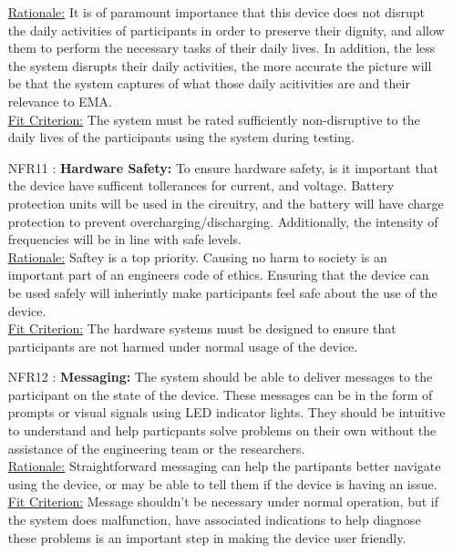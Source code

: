 \documentclass[12pt]{article}
\begin{document}
\begin{itemize}
\underline{Rationale:} It is of paramount importance that this device does not disrupt the daily activities of participants in order to preserve their dignity, and allow them to perform the necessary tasks of their daily lives. In addition, the less the system disrupts their daily activities, the more accurate the picture will be that the system captures of what those daily acitivities are and their relevance to EMA.\\

\underline{Fit Criterion:} The system must be rated sufficiently non-disruptive to the daily lives of the participants using the system during testing.\\

\item[NFR11 \label{NFR11}:]
  \textbf{Hardware Safety:} To ensure hardware safety, is it important that the device have sufficent tollerances for current, and voltage. Battery protection units will be used in the circuitry, and the battery will have charge protection to prevent overcharging/discharging. Additionally, the intensity of frequencies will be in line with safe levels.\\

\underline{Rationale:} Saftey is a top priority. Causing no harm to society is an important part of an engineers code of ethics. Ensuring that the device can be used safely will inherintly make participants feel safe about the use of the device.\\

\underline{Fit Criterion:} The hardware systems must be designed to ensure that participants are not harmed under normal usage of the device.\\

\item[NFR12 \label{NFR12}:]
  \textbf{Messaging:} The system should be able to deliver messages to the participant on the state of the device. These messages can be in the form of prompts or visual signals using LED indicator lights. They should be intuitive to understand and help particpants solve problems on their own without the assistance of the engineering team or the researchers.\\

\underline{Rationale:} Straightforward messaging can help the partipants better navigate using the device, or may be able to tell them if the device is having an issue.\\

\underline{Fit Criterion:} Message shouldn't be necessary under normal operation, but if the system does malfunction, have associated indications to help diagnose these problems is an important step in making the device user friendly.\\



\end{itemize}
\end{document}
